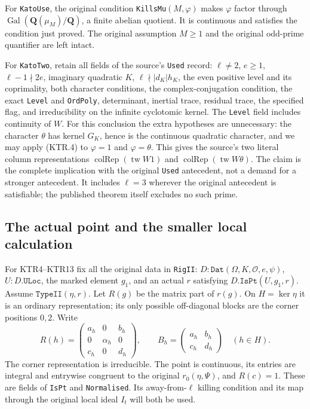 For \texttt{KatoUse}, the original condition
\texttt{KillsMu}\((M,\varphi)\) makes \(\varphi\) factor
through \(\operatorname{Gal}(\mathbf Q(\mu_M)/\mathbf Q)\),
a finite abelian quotient.  It is continuous and satisfies the
condition just proved.  The original assumption \(M\ge1\)
and the original odd-prime quantifier are left intact.

For \texttt{KatoTwo}, retain all fields of the source's
\texttt{Used} record: \(\ell\ne2\), \(e\ge1\),
\(\ell-1\nmid2e\), imaginary quadratic \(K\),
\(\ell\nmid|d_K|h_K\), the even positive level and its
coprimality, both character conditions, the complex-conjugation
condition, the exact \texttt{Level} and \texttt{OrdPoly},
determinant, inertial trace, residual trace, the specified flag,
and irreducibility on the infinite cyclotomic kernel.
The \texttt{Level} field includes continuity of \(W\).
For this conclusion the extra hypotheses are unnecessary:
the character \(\theta\) has kernel \(G_K\), hence is the
continuous quadratic character, and we may apply (KTR.4) to
\(\varphi=1\) and \(\varphi=\theta\).
This gives the source's two literal column representations
\(\operatorname{colRep}(\operatorname{tw}W1)\) and
\(\operatorname{colRep}(\operatorname{tw}W\theta)\).
The claim is the complete implication with the original
\texttt{Used} antecedent, not a demand for a stronger antecedent.
It includes \(\ell=3\) wherever the original antecedent is
satisfiable; the published theorem itself excludes no such prime.

\subsection{The actual point and the smaller local calculation}

For KTR4--KTR13 fix all the original data in \texttt{RigII}:
\(D:\texttt{Dat}(\Omega,K,\mathcal O,e,\psi)\),
\(U:D.\texttt{ULoc}\), the marked element \(g_1\), and
an actual \(r\) satisfying \(D.\texttt{IsPt}(U,g_1,r)\).
Assume \(\texttt{TypeII}(\eta,r)\).  Let \(R(g)\) be the
matrix part of \(r(g)\).  On \(H=\ker\eta\) it is an
ordinary representation; its only possible off-diagonal blocks
are the corner positions \(0,2\).  Write
\[
 R(h)=\begin{pmatrix}a_h&0&b_h\\0&\alpha_h&0\\c_h&0&d_h\end{pmatrix},
 \qquad B_h=\begin{pmatrix}a_h&b_h\\c_h&d_h\end{pmatrix}
 \quad(h\in H).
 \tag{KTR.5}
\]
The corner representation is irreducible.  The point is continuous,
its entries are integral and entrywise congruent to the original
\(r_0(\eta,\Psi)\), and \(R(c)=1\).
These are fields of \texttt{IsPt} and \texttt{Normalised}.
Its away-from-\(\ell\) killing condition and its map through
the original local ideal \(I_t\) will both be used.

